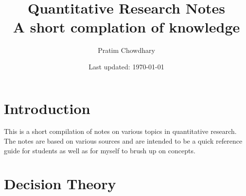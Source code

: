 \documentclass[letterpaper, 11pt]{article}
\newcommand{\1}{\mathds{1}}	%
\theoremstyle{definition}
\begin{document}

\title{Quantitative Research Notes \\[1em]
\normalsize A short complation of knowledge }

\author{\normalsize Pratim Chowdhary}
\date{\normalsize\vspace{-1ex} Last updated: \today}


\maketitle
\tableofcontents\label{sec:contents}


\section{Introduction}

This is a short compilation of notes on various topics in quantitative research. The notes are based on various sources and are intended to be a quick reference guide for students 
as well as for myself to brush up on concepts.

\section{Decision Theory}
\end{document}
